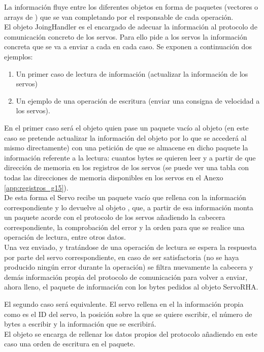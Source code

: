 	La información fluye entre los diferentes objetos en forma de paquetes (vectores o arrays de ) que se van completando por el responsable de cada operación.
	\\

	El objeto JoingHandler es el encargado de adecuar la información al protocolo de comunicación concreto de los servos. Para ello pide a los servos la información concreta que se va a enviar a cada en cada caso. Se exponen a continuación dos ejemplos:
	\begin{enumerate}
		\item Un primer caso de lectura de información (actualizar la información de los servos)
		\item Un ejemplo de una operación de escritura (enviar una consigna de velocidad a los servos).
	\end{enumerate}

	En el primer caso será el objeto  quien pase un paquete vacío al objeto  (en este caso se pretende actualizar la información del objeto  por lo que se accederá al mismo directamente) con una petición de que se almacene en dicho paquete la información referente a la lectura: cuantos bytes se quieren leer y a partir de que dirección de memoria en los registros de los servos (se puede ver una tabla con todas las direcciones de memoria disponibles en los servos en el Anexo \ref{app:registros_g15}).
	\\

	De esta forma el Servo recibe un paquete vacío que rellena con la información correspondiente y lo devuelve al objeto , que, a partir de esa información monta un paquete acorde con el protocolo de los servos añadiendo la cabecera correspondiente, la comprobación del error y la orden para que se realice una operación de lectura, entre otros datos.
	\\

	Una vez enviado, y tratándose de una operación de lectura se espera la respuesta por parte del servo correspondiente, en caso de ser satisfactoria (no se haya producido ningún error durante la operación) se filtra nuevamente la cabecera y demás información propia del protocolo de comunicación para volver a enviar, ahora lleno, el paquete de información con los bytes pedidos al objeto ServoRHA.


	El segundo caso será equivalente. El servo rellena en el  la información propia como es el ID del servo, la posición sobre la que se quiere escribir, el número de bytes a escribir y la información que se escribirá.
	\\
	El objeto  se encarga de rellenar los datos propios del protocolo añadiendo en este caso una orden de escritura en el paquete.
	\\

